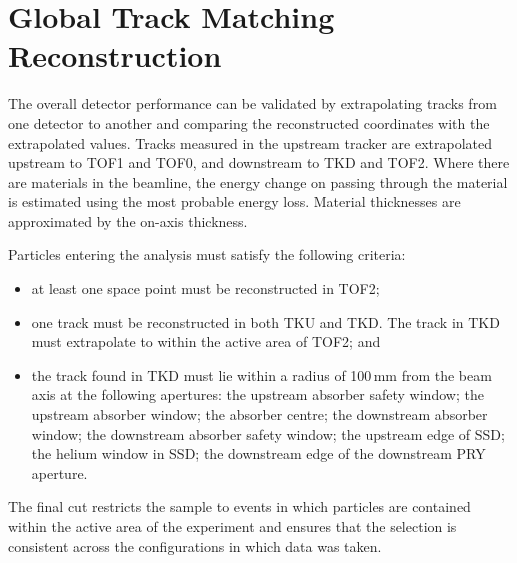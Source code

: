 \graphicspath{{08-Track-matching/Figures/}}

\section{Global Track Matching Reconstruction}
\label{Sect:TM}


\newcommand{\topmatterallplots}[4]{%
    \hspace*{-2.0cm}\texttt{[image: \#1/Figures/\#2/\#3.png]}
    \caption{#4 \label{fig:#3}}
    }

The overall detector performance can be validated by extrapolating tracks from
one detector to another and comparing the reconstructed coordinates with the 
extrapolated values.
Tracks measured in the upstream tracker are extrapolated upstream to TOF1 and TOF0, and downstream
to TKD and TOF2. Where there are materials in the beamline, the energy change on
passing through the material is estimated using the most probable energy loss. 
Material thicknesses are approximated by the on-axis thickness. 

Particles entering the analysis must satisfy the following criteria:
\begin{itemize}
\item at least one space point must be reconstructed in TOF2;
\item one track must be reconstructed in both TKU and TKD. The track in TKD must extrapolate to within the active area of TOF2; and
\item the track found in TKD must lie within a radius of 100\,mm from the beam axis at the following apertures:
the upstream absorber safety window; the upstream absorber window; the absorber centre; the downstream absorber window; the downstream absorber safety window; the upstream edge of SSD; the helium window in SSD; the downstream edge of the downstream PRY aperture.
\end{itemize}
The final cut restricts the sample to events in which particles are contained within the active area of the experiment and ensures that the selection is consistent across the configurations in which data was taken.




